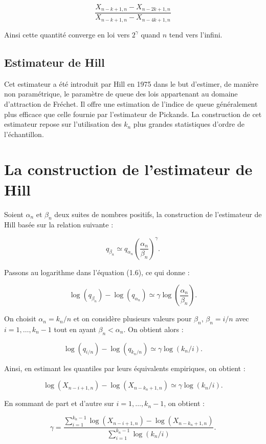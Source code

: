 \documentclass{article}
\begin{document}
\[
\frac{X_{n-k+1,n} - X_{n-2k+1,n}}{X_{n-k+1,n} - X_{n-4k+1,n}}
\]

Ainsi cette quantité converge en loi vers $2^{\gamma}$ quand $n$ tend vers l’infini.

\subsection{Estimateur de Hill}
Cet estimateur a été introduit par Hill en 1975 dans le but d’estimer, de manière non paramétrique, le paramètre de queue des lois appartenant au domaine d’attraction de Fréchet. Il offre une estimation de l’indice de queue généralement plus efficace que celle fournie par l’estimateur de Pickands. La construction de cet estimateur repose sur l’utilisation des $k_n$ plus grandes statistiques d’ordre de l’échantillon.
\section*{La construction de l’estimateur de Hill}

Soient $\alpha_n$ et $\beta_n$ deux suites de nombres positifs, la construction de l’estimateur de Hill basée sur la relation suivante :

\begin{equation}
    q_{\beta_n} \simeq q_{\alpha_n} \left( \frac{\alpha_n}{\beta_n} \right)^{\gamma}.
    \tag{1.6}
\end{equation}

Passons au logarithme dans l’équation (1.6), ce qui donne :

\[
\log(q_{\beta_n}) - \log(q_{\alpha_n}) \simeq \gamma \log\left( \frac{\alpha_n}{\beta_n} \right).
\]

On choisit $\alpha_n = k_n/n$ et on considère plusieurs valeurs pour $\beta_n$, $\beta_n = i/n$ avec $i = 1, \ldots, k_n - 1$ tout en ayant $\beta_n < \alpha_n$. On obtient alors :

\[
\log(q_{i/n}) - \log(q_{k_n/n}) \simeq \gamma \log(k_n/i).
\]

Ainsi, en estimant les quantiles par leurs équivalents empiriques, on obtient :

\[
\log(X_{n - i + 1, n}) - \log(X_{n - k_n + 1, n}) \simeq \gamma \log(k_n / i).
\]

En sommant de part et d’autre sur $i = 1, \ldots, k_n - 1$, on obtient :

\[
\gamma = \frac{\displaystyle \sum_{i=1}^{k_n - 1} \log(X_{n - i + 1, n}) - \log(X_{n - k_n + 1, n})}{\displaystyle \sum_{i=1}^{k_n - 1} \log(k_n / i)}.
\]
\end{document}
